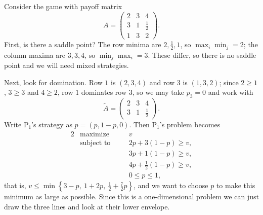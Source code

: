 \begin{example}
    Consider the game with payoff matrix
    $$
    A = \begin{pmatrix} 2 & 3 & 4\\ 3 & 1 & \frac12\\ 1 & 3 & 2\end{pmatrix}.
    $$
    First, is there a saddle point? The row minima are $2, \frac12, 1$, so $\max_i\min_j = 2$; the column maxima are $3, 3, 4$, so $\min_j\max_i = 3$. These differ, so there is no saddle point and we will need mixed strategies.

    Next, look for domination. Row $1$ is $(2,3,4)$ and row $3$ is $(1,3,2)$; since $2 \geq 1$, $3\geq 3$ and $4 \geq 2$, row $1$ dominates row $3$, so we may take $p_3 = 0$ and work with
    $$
    \tilde A = \begin{pmatrix}2 & 3 & 4\\3&1&\frac12\end{pmatrix}.
    $$
    Write $\mathrm{P}_1$'s strategy as $p = (p, 1-p, 0)$. Then $\mathrm{P}_1$'s problem becomes
    \begin{alignat*}{2}
        & \text{maximize} \quad && v \\
        & \text{subject to} \quad && 2p + 3(1-p) \geq v,\\
        & && 3p + 1(1-p) \geq v,\\
        & && 4p + \tfrac12(1-p) \geq v,\\
        & && 0 \leq p \leq 1,
    \end{alignat*}
    that is, $v \leq \min\left\{3 - p,\ 1 + 2p,\ \tfrac12 + \tfrac72 p\right\}$, and we want to choose $p$ to make this minimum as large as possible. Since this is a one-dimensional problem we can just draw the three lines and look at their lower envelope.

\begin{center}
\end{center}


\end{example}
